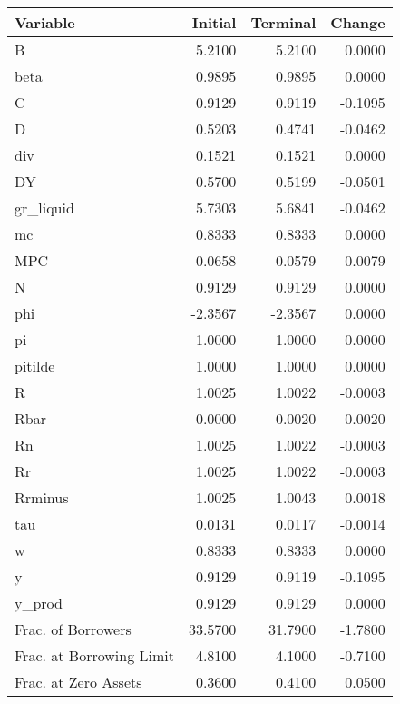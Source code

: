 \begin{table}
\centering
\label{tab:stst_comparison_low_beta_wedge_permanent}
\begin{tabular}{lrrr}
\toprule
                Variable &  Initial &  Terminal &  Change \\
\midrule
                       B &   5.2100 &    5.2100 &  0.0000 \\
                    beta &   0.9895 &    0.9895 &  0.0000 \\
                       C &   0.9129 &    0.9119 & -0.1095 \\
                       D &   0.5203 &    0.4741 & -0.0462 \\
                     div &   0.1521 &    0.1521 &  0.0000 \\
                      DY &   0.5700 &    0.5199 & -0.0501 \\
               gr\_liquid &   5.7303 &    5.6841 & -0.0462 \\
                      mc &   0.8333 &    0.8333 &  0.0000 \\
                     MPC &   0.0658 &    0.0579 & -0.0079 \\
                       N &   0.9129 &    0.9129 &  0.0000 \\
                     phi &  -2.3567 &   -2.3567 &  0.0000 \\
                      pi &   1.0000 &    1.0000 &  0.0000 \\
                 pitilde &   1.0000 &    1.0000 &  0.0000 \\
                       R &   1.0025 &    1.0022 & -0.0003 \\
                    Rbar &   0.0000 &    0.0020 &  0.0020 \\
                      Rn &   1.0025 &    1.0022 & -0.0003 \\
                      Rr &   1.0025 &    1.0022 & -0.0003 \\
                 Rrminus &   1.0025 &    1.0043 &  0.0018 \\
                     tau &   0.0131 &    0.0117 & -0.0014 \\
                       w &   0.8333 &    0.8333 &  0.0000 \\
                       y &   0.9129 &    0.9119 & -0.1095 \\
                  y\_prod &   0.9129 &    0.9129 &  0.0000 \\
      Frac. of Borrowers &  33.5700 &   31.7900 & -1.7800 \\
Frac. at Borrowing Limit &   4.8100 &    4.1000 & -0.7100 \\
    Frac. at Zero Assets &   0.3600 &    0.4100 &  0.0500 \\
\bottomrule
\end{tabular}
\end{table}
